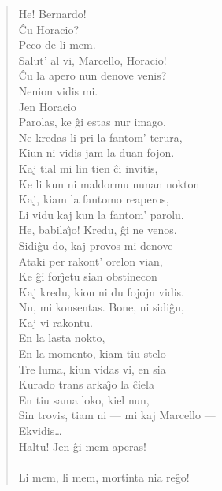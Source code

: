 \begin{verse}
 He! Bernardo!\\
 \^Cu Horacio?\\
 Peco de li mem.\\
 Salut' al vi, Marcello, Horacio!\\
 \^Cu la apero nun denove venis?\\
 Nenion vidis mi.\\
  Jen Horacio\\ Parolas, ke \^gi estas nur imago,\\ Ne kredas li
pri la fantom' terura,\\ Kiun ni vidis jam la duan fojon.\\ Kaj tial
mi lin tien \^ci invitis,\\ Ke li kun ni maldormu nunan nokton\\
Kaj, kiam la fantomo reaperos,\\ Li vidu kaj kun la fantom' parolu.\\
 He, babila\^{\j}o! Kredu, \^gi ne venos.\\
 Sidi\^gu do, kaj provos mi denove\\ Ataki per rakont' orelon
vian,\\ Ke \^gi for\^{\j}etu sian obstinecon\\ Kaj kredu, kion ni du
fojojn vidis.\\
 Nu, mi konsentas. Bone, ni sidi\^gu,\\ Kaj vi rakontu.\\
 En la lasta nokto,\\ En la momento, kiam tiu stelo\\ Tre luma,
kiun vidas vi, en sia\\ Kurado trans arka\^{\j}o la \^ciela\\ En tiu
sama loko, kiel nun,\\ Sin trovis, tiam ni --- mi kaj Marcello ---\\
Ekvidis\dots\\
 Haltu! Jen \^gi mem aperas!\\
\\
 Li mem, li mem, mortinta nia reĝo!\\

\end{verse}
